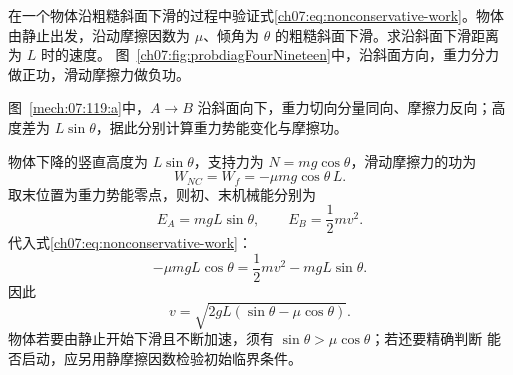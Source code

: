 {
\begin{origexamplebox}{}\label{ch07:ex:s12-4-19}
在一个物体沿粗糙斜面下滑的过程中验证式\eqref{ch07:eq:nonconservative-work}。物体由静止出发，沿动摩擦因数为
$\mu$、倾角为 $\theta$ 的粗糙斜面下滑。求沿斜面下滑距离为 $L$ 时的速度。
图~\ref{ch07:fig:probdiagFourNineteen}中，沿斜面方向，重力分力做正功，滑动摩擦力做负功。
\probdiagFourNineteen
\end{origexamplebox}

\begin{xesolution}
\begin{qualityfigure}
\label{mech:07:119:a}
\end{qualityfigure}
图~\ref{mech:07:119:a}中，$A\to B$ 沿斜面向下，重力切向分量同向、摩擦力反向；高度差为 $L\sin\theta$，据此分别计算重力势能变化与摩擦功。

物体下降的竖直高度为 $L\sin\theta$，支持力为 $N=mg\cos\theta$，滑动摩擦力的功为
\[
 W_{NC}=W_f=-\mu mg\cos\theta\,L.
\]
取末位置为重力势能零点，则初、末机械能分别为
\[
 E_A=mgL\sin\theta,
 \qquad
 E_B=\frac12mv^2.
\]
代入式\eqref{ch07:eq:nonconservative-work}：
\[
 -\mu mgL\cos\theta
 =\frac12mv^2-mgL\sin\theta.
\]
因此
\[
 \boxed{v=\sqrt{2gL(\sin\theta-\mu\cos\theta)}}.
\]
物体若要由静止开始下滑且不断加速，须有 $\sin\theta>\mu\cos\theta$；若还要精确判断
能否启动，应另用静摩擦因数检验初始临界条件。
\end{xesolution}

}
